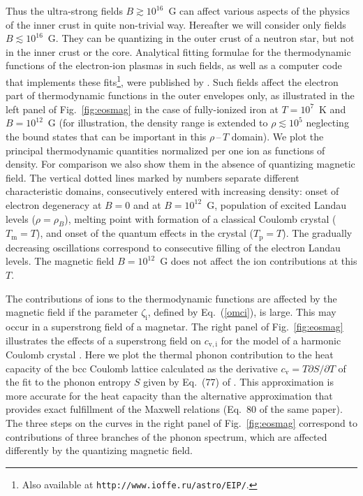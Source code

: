 \documentclass[smallextended]{svjour3}       %
\newcommand{\req}[1]{Eq.~(\ref{#1})}
\newcommand{\Tp}{T_\mathrm{p}}
\newcommand{\zeti}{\zeta_\mathrm{i}}
\begin{document}
Thus the ultra-strong fields $B\gtrsim10^{16}$~G can affect
various aspects of the physics of the inner crust
in quite non-trivial way. Hereafter
we will consider only  fields $B\lesssim10^{16}$~G. They can
be quantizing  in the outer crust of a neutron star, but not
in the inner crust or the core. Analytical fitting formulae
for the thermodynamic functions of the electron-ion plasmas
in such fields, as well as a computer code that implements
these fits\footnote{Also available at
\texttt{http://www.ioffe.ru/astro/EIP/}.}, were published by \citet{PC13}. Such fields affect
the electron part of thermodynamic functions in the outer
envelopes only, as illustrated in the left panel of
Fig.~\ref{fig:eosmag} in the case of fully-ionized iron 
at $T=10^7$~K and $B=10^{12}$~G  (for illustration, the
density range is extended to $\rho\lesssim10^5$ neglecting
the bound states that can be important in this
$\rho$\,--\,$T$ domain).  We plot the principal
thermodynamic quantities normalized per one ion as functions
of density. For comparison we also show them in the absence
of quantizing magnetic field. The vertical dotted lines
marked by numbers separate different characteristic domains,
consecutively entered with increasing density: onset of
electron degeneracy at $B=0$ and at $B=10^{12}$~G,
population of excited Landau levels ($\rho=\rho_B$), melting
point with formation of a classical Coulomb crystal
($T_\mathrm{m}=T$), and onset of the quantum effects in the
crystal ($\Tp=T$). The gradually decreasing oscillations
correspond to consecutive filling of the electron Landau
levels. The magnetic field $B=10^{12}$~G does not affect the
ion contributions at this $T$.

The contributions of ions to the thermodynamic functions are
affected by the magnetic field if the parameter $\zeti$,
defined by \req{omci}, is large. This may occur in a
superstrong field of a magnetar. The right panel of
Fig.~\ref{fig:eosmag} illustrates the effects of a
superstrong field on $c_\mathrm{v,i}$ for the model of a
harmonic Coulomb crystal \citep{Baiko09}. Here we plot the
thermal phonon contribution to the heat capacity of the bcc
Coulomb lattice calculated as the derivative
$c_\mathrm{v}=T\partial S/\partial T$ of the fit to the
phonon entropy $S$ given by Eq.~(77) of \citet{PC13}. This
approximation is more accurate for the heat capacity than
the alternative approximation that provides exact
fulfillment of the Maxwell relations (Eq.~80 of the same
paper). The three steps on the curves in the right panel of
Fig.~\ref{fig:eosmag} correspond to contributions of three
branches of the phonon spectrum, which are affected
differently by the quantizing magnetic field.
\end{document}
